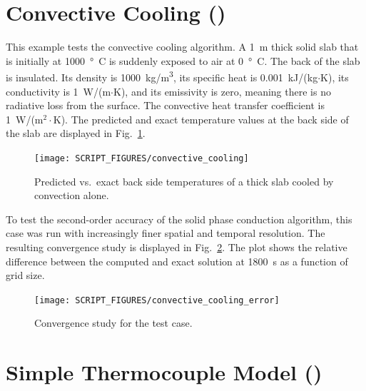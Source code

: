 \documentclass[11pt]{book}
\begin{document}
\clearpage

\section{Convective Cooling (\texorpdfstring{}{convective\_cooling})}
\label{convective_cooling}

This example tests the convective cooling algorithm. A 1~m thick solid slab that is initially at 1000~\si{\degree C} is suddenly exposed to air at 0~\si{\degree C}. The back of the slab is insulated. Its density is 1000~\si{kg/m^3}, its specific heat is 0.001~kJ/(kg$\cdot$K), its conductivity is 1~W/(m$\cdot$K), and its emissivity is zero, meaning there is no radiative loss from the surface. The convective heat transfer coefficient is 1~W/(m$^2\cdot$K). The predicted and exact temperature values at the back side of the slab are displayed in Fig.~\ref{convective_cooling_fig}.

\begin{figure}[ht]
\centering
\texttt{[image: SCRIPT\_FIGURES/convective\_cooling]}
\caption[The  test case]{Predicted vs.~exact back side temperatures of a thick slab cooled by convection alone.}
\label{convective_cooling_fig}
\end{figure}

To test the second-order accuracy of the solid phase conduction algorithm, this case was run with increasingly finer spatial and temporal resolution. The resulting convergence study is displayed in Fig.~\ref{convective_cooling_convergence}. The plot shows the relative difference between the computed and exact solution at 1800~s as a function of grid size.

\begin{figure}[ht]
\centering
\texttt{[image: SCRIPT\_FIGURES/convective\_cooling\_error]}
\caption[Convergence study for the  test case]{Convergence study for the  test case.}
\label{convective_cooling_convergence}
\end{figure}


\clearpage

\section{Simple Thermocouple Model (\texorpdfstring{}{thermocouples})}
\label{thermocouples}
\end{document}
